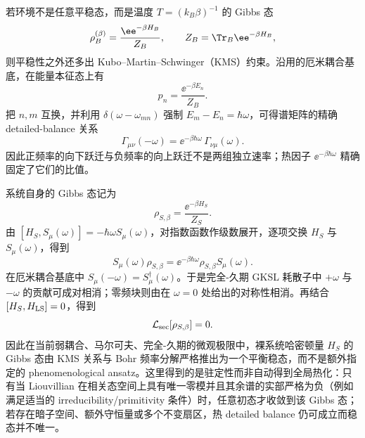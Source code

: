 若环境不是任意平稳态，而是温度 $T=(k_B\beta)^{-1}$ 的 Gibbs 态
\begin{equation}
\rho_B^{(\beta)}=\frac{\ee^{-\beta H_B}}{Z_B},
\qquad
Z_B=\Tr_B\ee^{-\beta H_B},
\label{eq:phys-oqs-bath-gibbs-state}
\end{equation}
则平稳性之外还多出 Kubo--Martin--Schwinger（KMS）约束。沿用的厄米耦合基底，在能量本征态上有
\[
p_n=\frac{\ee^{-\beta E_n}}{Z_B}.
\]
把 $n,m$ 互换，并利用 $\delta(\omega-\omega_{mn})$ 强制 $E_m-E_n=\hbar\omega$，可得谱矩阵的精确 detailed-balance 关系
\begin{equation}
\Gamma_{\mu\nu}(-\omega)
=\ee^{-\beta\hbar\omega}\,
\Gamma_{\nu\mu}(\omega).
\label{eq:phys-oqs-kms-detailed-balance}
\end{equation}
因此正频率的向下跃迁与负频率的向上跃迁不是两组独立速率；热因子 $\ee^{-\beta\hbar\omega}$ 精确固定了它们的比值。

系统自身的 Gibbs 态记为
\begin{equation}
\rho_{S,\beta}=\frac{\ee^{-\beta H_S}}{Z_S}.
\label{eq:phys-oqs-system-gibbs-state}
\end{equation}
由 $[H_S,S_\mu(\omega)]=-\hbar\omega S_\mu(\omega)$，对指数函数作级数展开，逐项交换 $H_S$ 与 $S_\mu(\omega)$，得到
\begin{equation}
S_\mu(\omega)\rho_{S,\beta}
=\ee^{-\beta\hbar\omega}
\rho_{S,\beta}S_\mu(\omega).
\label{eq:phys-oqs-gibbs-intertwining}
\end{equation}
在厄米耦合基底中 $S_\mu(-\omega)=S_\mu^\dagger(\omega)$。于是完全-久期 GKSL 耗散子中 $+\omega$ 与 $-\omega$ 的贡献可成对相消；零频块则由在 $\omega=0$ 处给出的对称性相消。再结合 $[H_S,H_{\rm LS}]=0$，得到
\begin{equation}
\mathcal L_{\rm sec}[\rho_{S,\beta}]=0.
\label{eq:phys-oqs-gibbs-stationary}
\end{equation}
因此在当前弱耦合、马尔可夫、完全-久期的微观极限中，裸系统哈密顿量 $H_S$ 的 Gibbs 态由 KMS 关系与 Bohr 频率分解严格推出为一个平衡稳态，而不是额外指定的 phenomenological ansatz。这里得到的是驻定性而非自动得到全局热化：只有当 Liouvillian 在相关态空间上具有唯一零模并且其余谱的实部严格为负（例如满足适当的 irreducibility/primitivity 条件）时，任意初态才收敛到该 Gibbs 态；若存在暗子空间、额外守恒量或多个不变扇区，热 detailed balance 仍可成立而稳态并不唯一。

